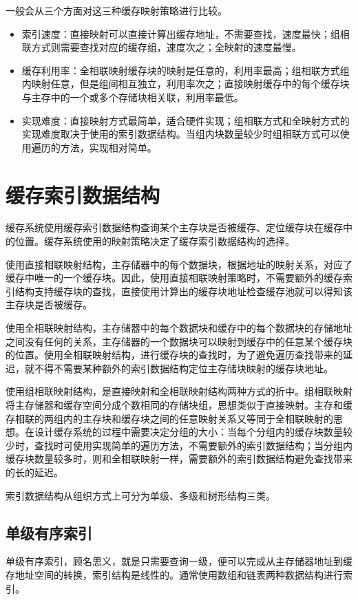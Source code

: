 一般会从三个方面对这三种缓存映射策略进行比较。
\begin{itemize}
\item 索引速度：直接映射可以直接计算出缓存地址，不需要查找，速度最快；组相联方式则需要查找对应的缓存组，速度次之；全映射的速度最慢。
\item
缓存利用率：全相联映射缓存块的映射是任意的，利用率最高；组相联方式组内映射任意，但是组间相互独立，利用率次之；直接映射缓存中的每个缓存块与主存中的一个或多个存储块相关联，利用率最低。
\item
实现难度：直接映射方式最简单，适合硬件实现；组相联方式和全映射方式的实现难度取决于使用的索引数据结构。当组内块数量较少时组相联方式可以使用遍历的方法，实现相对简单。
\end{itemize}

\section{缓存索引数据结构}
\label{sec:cache_indexing}

缓存系统使用缓存索引数据结构查询某个主存块是否被缓存、定位缓存块在缓存中的位置。缓存系统使用的映射策略决定了缓存索引数据结构的选择。

使用直接相联映射结构，主存储器中的每个数据块，根据地址的映射关系，对应了缓存中唯一的一个缓存块。因此，使用直接相联映射策略时，不需要额外的缓存索引结构支持缓存块的查找，直接使用计算出的缓存块地址检查缓存池就可以得知该主存块是否被缓存。

使用全相联映射结构，主存储器中的每个数据块和缓存中的每个数据块的存储地址之间没有任何的关系，主存储器的一个数据块可以映射到缓存中的任意某个缓存块的位置。使用全相联映射结构，进行缓存块的查找时，为了避免遍历查找带来的延迟，就不得不需要某种额外的索引数据结构定位主存储块映射的缓存块地址。

使用组相联映射结构，是直接映射和全相联映射结构两种方式的折中。组相联映射将主存储器和缓存空间分成个数相同的存储块组，思想类似于直接映射。主存和缓存相联的两组内的主存块和缓存块之间的任意映射关系又等同于全相联映射的思想。在设计缓存系统的过程中需要决定分组的大小：当每个分组内的缓存块数量较少时，查找时可使用实现简单的遍历方法，不需要额外的索引数据结构；当分组内缓存块数量较多时，则和全相联映射一样，需要额外的索引数据结构避免查找带来的长的延迟。

索引数据结构从组织方式上可分为单级、多级和树形结构三类。

\subsection{单级有序索引}
单级有序索引，顾名思义，就是只需要查询一级，便可以完成从主存储器地址到缓存地址空间的转换，索引结构是线性的。通常使用数组和链表两种数据结构进行索引。

